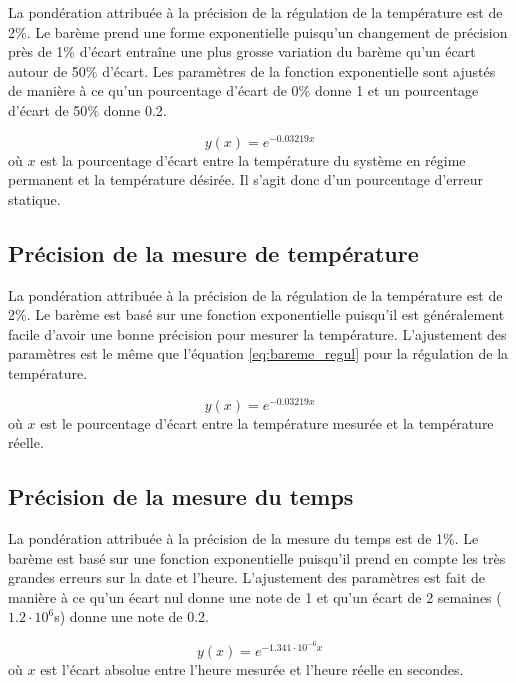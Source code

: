 La pondération attribuée à la précision de la régulation de la température est de 2$\%$. Le barème prend une forme exponentielle puisqu'un changement de précision près de 1$\%$ d'écart entraîne une plus grosse variation du barème qu'un écart autour de 50$\%$ d'écart. Les paramètres de la fonction exponentielle sont ajustés de manière à ce qu'un pourcentage d'écart de 0$\%$ donne 1 et un pourcentage d'écart de 50$\%$ donne 0.2.

\begin{equation}
    y(x) = e^{-0.03219x}
    \label{eq:bareme_regul}
\end{equation}
où $x$ est la pourcentage d'écart entre la température du système en régime permanent et la température désirée. Il s'agit donc d'un pourcentage d'erreur statique.

\subsection{Précision de la mesure de température}

La pondération attribuée à la précision de la régulation de la température est de 2$\%$. Le barème est basé sur une fonction exponentielle puisqu'il est généralement facile d'avoir une bonne précision pour mesurer la température. L'ajustement des paramètres est le même que l'équation \ref{eq:bareme_regul} pour la régulation de la température.

\begin{equation}
    y(x) = e^{-0.03219x}
    \label{eq:bareme_precision_temperature}
\end{equation}
où $x$ est le pourcentage d'écart entre la température mesurée et la température réelle.

\subsection{Précision de la mesure du temps}

La pondération attribuée à la précision de la mesure du temps est de 1$\%$. Le barème est basé sur une fonction exponentielle puisqu'il prend en compte les très grandes erreurs sur la date et l'heure. L'ajustement des paramètres est fait de manière à ce qu'un écart nul donne une note de 1 et qu'un écart de 2 semaines ($1.2\cdot 10^6$s) donne une note de 0.2.

\begin{equation}
    y(x) = e^{-1.341\cdot10^{-6}x}
    \label{eq:bareme_precision_temps}
\end{equation}
où $x$ est l'écart absolue entre l'heure mesurée et l'heure réelle en secondes.

